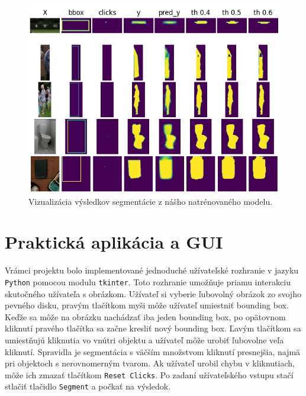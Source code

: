 \documentclass [11pt, a4paper, twocolumn]{article}
\begin{document}
\begin{figure}[H]
\centering
\includegraphics[width=\linewidth]{results3}
\caption{Vizualizácia výsledkov segmentácie z nášho natrénovaného modelu.}
\end{figure}

\section{Praktická aplikácia a GUI}

Vrámci projektu bolo implementované jednoduché užívateľské rozhranie v jazyku \texttt{Python} pomocou modulu \texttt{tkinter}. Toto rozhranie umožňuje priamu interakciu skutočného užívateľa s obrázkom. Užívateľ si vyberie ľubovolný obrázok zo svojho pevného disku, pravým tlačítkom myši môže užívateľ umiestniť bounding box. Keďže sa môže na obrázku nachádzať iba jeden bounding box, po opätovnom kliknutí pravého tlačítka sa začne kresliť nový bounding box. Ľavým tlačítkom sa umiestňujú kliknutia vo vnútri objektu a užívateľ môže urobiť ľubovolne veľa kliknutí. Spravidla je segmentácia s väčším množstvom kliknutí presnejšia, najmä pri objektoch s nerovnomerným tvarom. Ak užívateľ urobil chybu v kliknutiach, môže ich zmazať tlačítkom \texttt{Reset Clicks}. Po zadaní užívateľského vstupu stačí stlačiť tlačidlo \texttt{Segment} a počkať na výsledok.
\end{document}
